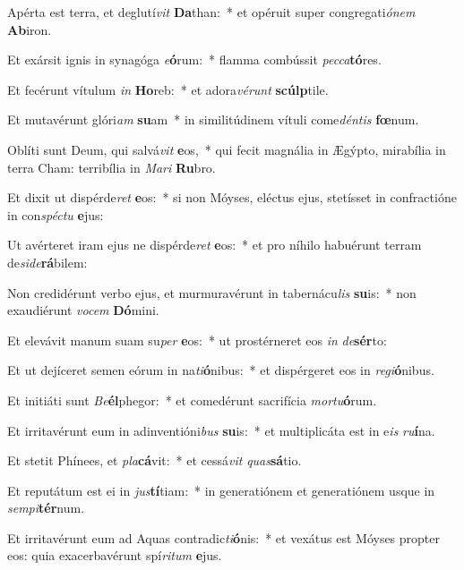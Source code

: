 \item Apérta est terra, et deglutí\textit{vit} \textbf{Da}than:~* et opéruit super congregati\textit{ó}\textit{nem} \textbf{Ab}iron.
\item Et exársit ignis in synagóga \textit{e}\textbf{ó}rum:~* flamma combússit \textit{pec}\textit{ca}\textbf{tó}res.
\item Et fecérunt vítulum \textit{in} \textbf{Ho}reb:~* et adora\textit{vé}\textit{runt} \textbf{scúlp}tile.
\item Et mutavérunt glóri\textit{am} \textbf{su}am~* in similitúdinem vítuli come\textit{dén}\textit{tis} \textbf{fœ}num.
\item Oblíti sunt Deum, qui salvá\textit{vit} \textbf{e}os,~* qui fecit magnália in Ægýpto, mirabília in terra Cham: terribília in \textit{Ma}\textit{ri} \textbf{Ru}bro.
\item Et dixit ut dispérde\textit{ret} \textbf{e}os:~* si non Móyses, eléctus ejus, stetísset in confractióne in con\textit{spéc}\textit{tu} \textbf{e}jus:
\item Ut avérteret iram ejus ne dispérde\textit{ret} \textbf{e}os:~* et pro níhilo habuérunt terram de\textit{si}\textit{de}\textbf{rá}bilem:
\item Non credidérunt verbo ejus, et murmuravérunt in tabernácu\textit{lis} \textbf{su}is:~* non exaudiérunt \textit{vo}\textit{cem} \textbf{Dó}mini.
\item Et elevávit manum suam su\textit{per} \textbf{e}os:~* ut prostérneret eos \textit{in} \textit{de}\textbf{sér}to:
\item Et ut dejíceret semen eórum in na\textit{ti}\textbf{ó}nibus:~* et dispérgeret eos in \textit{re}\textit{gi}\textbf{ó}nibus.
\item Et initiáti sunt \textit{Be}\textbf{él}phegor:~* et comedérunt sacrifícia \textit{mor}\textit{tu}\textbf{ó}rum.
\item Et irritavérunt eum in adinventióni\textit{bus} \textbf{su}is:~* et multiplicáta est in e\textit{is} \textit{ru}\textbf{í}na.
\item Et stetit Phínees, et \textit{pla}\textbf{cá}vit:~* et cessá\textit{vit} \textit{quas}\textbf{sá}tio.
\item Et reputátum est ei in \textit{jus}\textbf{tí}tiam:~* in generatiónem et generatiónem usque in \textit{sem}\textit{pi}\textbf{tér}num.
\item Et irritavérunt eum ad Aquas contradic\textit{ti}\textbf{ó}nis:~* et vexátus est Móyses propter eos: quia exacerbavérunt spí\textit{ri}\textit{tum} \textbf{e}jus.
